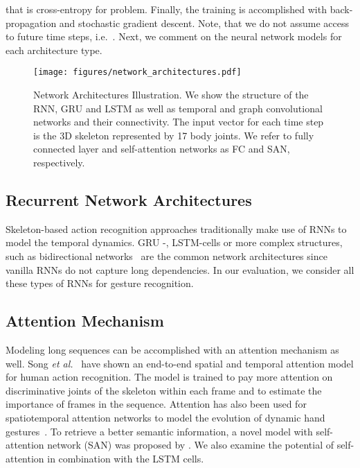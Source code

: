 \documentclass[letterpaper, 10 pt, conference]{ieeeconf}
\def \nobreakseq {\nobreak \hskip 0pt \hbox}
\begin{document}
that is cross-entropy for problem. Finally, the training is accomplished with back-propagation and stochastic gradient descent. Note, that we do not assume access to future time steps, i.e.~. Next, we comment on the neural network models for each architecture type.

\begin{figure*}[t]
    \centering
    \texttt{[image: figures/network\_architectures.pdf]}
    \caption{ Network Architectures Illustration. We show the structure of the RNN, GRU and LSTM as well as temporal and graph convolutional networks and their connectivity. The input vector for each time step is the 3D skeleton represented by 17 body joints. We refer to fully connected layer and self-attention networks as FC and SAN, respectively.}
    \label{ModelsArch}
\end{figure*}

\subsection{Recurrent Network Architectures}

Skeleton-based action recognition approaches traditionally make use of RNNs to model the temporal dynamics. GRU\nobreakseq{-,} LSTM-cells or more complex structures, such as bidirectional networks~\cite{Zhu2016Co-OccurrenceNetworks} are the common network architectures since vanilla RNNs do not capture long dependencies. In our evaluation, we consider all these types of RNNs for gesture recognition. 

\subsection{Attention Mechanism}

Modeling long sequences can be accomplished with an attention mechanism as well. Song \textit{et al.}~\cite{Song2017AnData} have shown an end-to-end spatial and temporal attention model for human action recognition. The model is trained to pay more attention on discriminative joints of the skeleton within each frame and to estimate the importance of frames in the sequence. Attention has also been used for spatiotemporal attention networks to model the evolution of dynamic hand gestures~\cite{Hou2019Spatial-temporalRecognition}. To retrieve a better semantic information, a novel model with self-attention network (SAN) was proposed by \cite{Cho2019Self-AttentionRecognition}. We also examine the potential of self-attention in combination with the LSTM cells.
\end{document}
